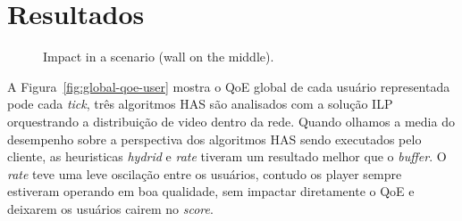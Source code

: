\section{Resultados}
\label{sec:results}

\begin{figure}
    \centering
    \caption{Impact in a scenario (wall on the middle).
    }
    \label{fig:comparison-rof-3}
\end{figure}


A Figura~\ref{fig:global-qoe-user} mostra o QoE global de cada usuário representada pode cada \textit{tick}, três algoritmos HAS são analisados com a solução ILP orquestrando a distribuição de video dentro da rede. Quando olhamos a media do desempenho sobre a perspectiva dos algoritmos HAS sendo executados pelo cliente, as heuristicas \textit{hydrid} e \textit{rate} tiveram um resultado melhor que o \textit{buffer}. O \textit{rate} teve uma leve oscilação entre os usuários, contudo os player sempre estiveram operando em boa qualidade, sem impactar diretamente o QoE e deixarem os usuários cairem no \textit{score}.

